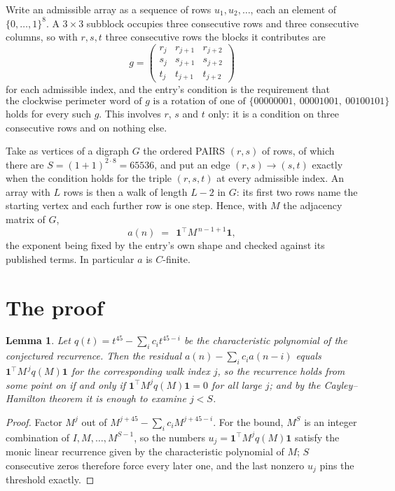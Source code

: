 \documentclass[11pt,a4paper]{article}
\theoremstyle{plain}
\newtheorem{lemma}[theorem]{Lemma}
\theoremstyle{definition}
\begin{document}
Write an admissible array as a sequence of rows $u_1,u_2,\dots$, each an element of
$\{0,\dots,1\}^{8}$. A $3\times3$ subblock occupies three consecutive rows and
three consecutive columns, so with $r,s,t$ three consecutive rows the blocks it
contributes are
\[
g=\begin{pmatrix}r_j&r_{j+1}&r_{j+2}\\ s_j&s_{j+1}&s_{j+2}\\ t_j&t_{j+1}&t_{j+2}\end{pmatrix}
\]
for each admissible index, and the entry's condition is the requirement that
\[
\text{the clockwise perimeter word of }g\text{ is a rotation of one of }\{00000001,\ 00001001,\ 00100101\}
\]
holds for every such $g$. This involves $r$, $s$ and $t$ only: it is a condition on
three consecutive rows and on nothing else.

Take as vertices of a digraph $G$ the ordered PAIRS $(r,s)$ of rows, of which there are
$S=(1+1)^{2\cdot8}=65536$, and put an edge $(r,s)\to(s,t)$ exactly when the condition
holds for the triple $(r,s,t)$ at every admissible index. An array with $L$ rows is then a
walk of length $L-2$ in $G$: its first two rows name the starting vertex and each further
row is one step. Hence, with $M$ the adjacency matrix of $G$,
\[
a(n)\;=\;\,\mathbf{1}^{\!\top}M^{\,n-1+1}\mathbf{1},
\]
the exponent being fixed by the entry's own shape and checked against its published terms.
In particular $a$ is $C$-finite.

\section{The proof}

\begin{lemma}\label{lem:crit}
Let $q(t)=t^{45}-\sum_i c_it^{45-i}$ be the characteristic polynomial of the
conjectured recurrence. Then the residual $a(n)-\sum_ic_ia(n-i)$ equals
$\mathbf{1}^{\!\top}M^{\,j}q(M)\mathbf{1}$ for the corresponding walk index
$j$, so the recurrence holds from some point on if and only if
$\mathbf{1}^{\!\top}M^{j}q(M)\mathbf{1}=0$ for all large $j$; and by the
Cayley--Hamilton theorem it is enough to examine $j<S$.
\end{lemma}

\begin{proof}
Factor $M^{j}$ out of $M^{j+45}-\sum_ic_iM^{j+45-i}$. For the bound, $M^{S}$
is an integer combination of $I,M,\dots,M^{S-1}$, so the numbers
$u_j=\mathbf{1}^{\!\top}M^{j}q(M)\mathbf{1}$ satisfy the monic linear recurrence given by
the characteristic polynomial of $M$; $S$ consecutive zeros therefore force every later one,
and the last nonzero $u_j$ pins the threshold exactly.
\end{proof}
\end{document}

